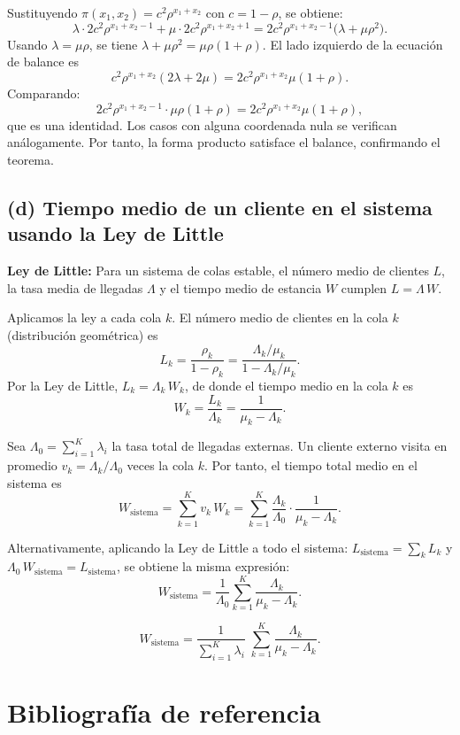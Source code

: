 \documentclass[10pt,a4paper]{article}
\begin{document}
Sustituyendo \( \pi(x_1,x_2)=c^2\rho^{x_1+x_2} \) con \( c=1-\rho \), se obtiene:
\[
\lambda\cdot 2c^2\rho^{x_1+x_2-1} + \mu\cdot 2c^2\rho^{x_1+x_2+1}
= 2c^2\rho^{x_1+x_2-1}\bigl(\lambda + \mu\rho^2\bigr).
\]
Usando \( \lambda = \mu\rho \), se tiene \( \lambda + \mu\rho^2 = \mu\rho(1+\rho) \). El lado izquierdo de la ecuación de balance es
\[
c^2\rho^{x_1+x_2}(2\lambda+2\mu)=2c^2\rho^{x_1+x_2}\mu(1+\rho).
\]
Comparando:
\[
2c^2\rho^{x_1+x_2-1}\cdot\mu\rho(1+\rho)=2c^2\rho^{x_1+x_2}\mu(1+\rho),
\]
que es una identidad. Los casos con alguna coordenada nula se verifican análogamente. Por tanto, la forma producto satisface el balance, confirmando el teorema.

\subsection*{(d) Tiempo medio de un cliente en el sistema usando la Ley de Little}
\textbf{Ley de Little:} Para un sistema de colas estable, el número medio de clientes \( L \), la tasa media de llegadas \( \Lambda \) y el tiempo medio de estancia \( W \) cumplen \( L = \Lambda\,W \).

Aplicamos la ley a cada cola \( k \). El número medio de clientes en la cola \( k \) (distribución geométrica) es
\[
L_k = \frac{\rho_k}{1-\rho_k} = \frac{\Lambda_k/\mu_k}{1-\Lambda_k/\mu_k}.
\]
Por la Ley de Little, \( L_k = \Lambda_k\,W_k \), de donde el tiempo medio en la cola \( k \) es
\[
W_k = \frac{L_k}{\Lambda_k} = \frac{1}{\mu_k-\Lambda_k}.
\]

Sea \( \Lambda_0 = \sum_{i=1}^K \lambda_i \) la tasa total de llegadas externas. Un cliente externo visita en promedio \( v_k = \Lambda_k/\Lambda_0 \) veces la cola \( k \). Por tanto, el tiempo total medio en el sistema es
\[
W_{\text{sistema}} = \sum_{k=1}^K v_k\,W_k = \sum_{k=1}^K \frac{\Lambda_k}{\Lambda_0}\cdot\frac{1}{\mu_k-\Lambda_k}.
\]

Alternativamente, aplicando la Ley de Little a todo el sistema: \( L_{\text{sistema}} = \sum_k L_k \) y \( \Lambda_0\,W_{\text{sistema}} = L_{\text{sistema}} \), se obtiene la misma expresión:
\[
W_{\text{sistema}} = \frac{1}{\Lambda_0}\sum_{k=1}^K \frac{\Lambda_k}{\mu_k-\Lambda_k}.
\]

\[
\boxed{W_{\text{sistema}} = \frac{1}{\sum_{i=1}^K \lambda_i}\;\sum_{k=1}^K \frac{\Lambda_k}{\mu_k-\Lambda_k}}.
\]

\newpage
\section{Bibliografía de referencia}
\end{document}
